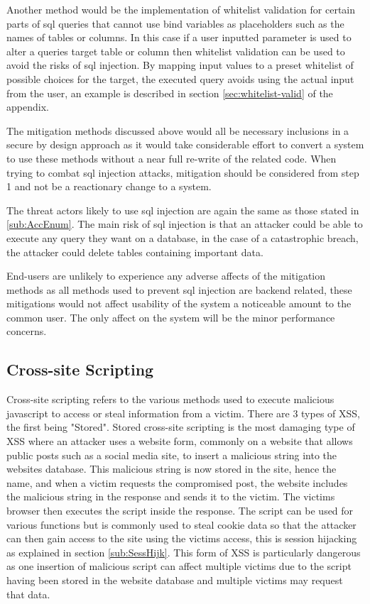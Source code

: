 \documentclass{ueacmpstyle}
\begin{document}
      Another method would be the implementation of whitelist validation for certain 
      parts of sql queries that cannot use bind variables as placeholders such as the 
      names of tables or columns. In this case if a user inputted parameter is used to 
      alter a queries target table or column then whitelist validation can be used to 
      avoid the risks of sql injection. By mapping input values to a preset whitelist 
      of possible choices for the target, the executed query avoids using the actual 
      input from the user, an example is described in section \ref{sec:whitelist-valid} 
      of the appendix.

      The mitigation methods discussed above would all be necessary inclusions in a 
      secure by design approach as it would take considerable effort to convert a system 
      to use these methods without a near full re-write of the related code. When trying 
      to combat sql injection attacks, mitigation should be considered from step 1 and not 
      be a reactionary change to a system.

      The threat actors likely to use sql injection are again the same as those stated 
      in \ref{sub:AccEnum}. The main risk of sql injection is that an attacker could be 
      able to execute any query they want on a database, in the case of a catastrophic 
      breach, the attacker could delete tables containing important data.

      End-users are unlikely to experience any adverse affects of the mitigation methods 
      as all methods used to prevent sql injection are backend related, these mitigations 
      would not affect usability of the system a noticeable amount to the common user. 
      The only affect on the system will be the minor performance concerns.

      \subsection{Cross-site Scripting}\label{sub:XSS}
      Cross-site scripting refers to the various methods used to execute malicious 
      javascript to access or steal information from a victim. There are 3 types of XSS, 
      the first being "Stored". Stored cross-site scripting is the most damaging type of 
      XSS where an attacker uses a website form, commonly on a website that allows public 
      posts such as a social media site, to insert a malicious string into the websites 
      database. This malicious string is now stored in the site, hence the name, and when 
      a victim requests the compromised post, the website includes the malicious string in 
      the response and sends it to the victim. The victims browser then executes the script 
      inside the response. The script can be used for various functions but is commonly used 
      to steal cookie data so that the attacker can then gain access to the site using the 
      victims access, this is session hijacking as explained in section \ref{sub:SessHijk}. 
      This form of XSS is particularly dangerous as one insertion of malicious script can 
      affect multiple victims due to the script having been stored in the website database 
      and multiple victims may request that data.
\end{document}
